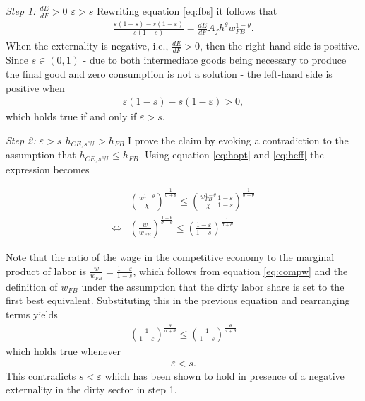 \textit{Step 1: $\frac{dE}{dF}>0$ \ar $\varepsilon>s$}
Rewriting equation \ref{eq:fbs} it follows that
\begin{align}
\frac{\varepsilon(1-s)-s(1-\varepsilon)}{s(1-s)}=\frac{dE}{dF}A_fh^\theta w_{FB}^{1-\theta}.
\end{align}
When the externality is negative, i.e., $\frac{dE}{dF}>0$, then the right-hand side is positive.
Since $s\in(0,1)$ - due to both intermediate goods being necessary to produce the final good and zero consumption is not a solution - the left-hand side is positive when
\begin{align}
\varepsilon(1-s)-s(1-\varepsilon)>0,
\end{align}
which holds true if and only if $\varepsilon>s$.


\textit{Step 2: $\varepsilon>s$ \ar $h_{CE, s^{eff}}>h_{FB}$}
I prove the claim by evoking a contradiction to the assumption that $h_{CE, s^{eff}}\leq h_{FB}$. Using equation \ref{eq:hopt} and \ref{eq:heff} the expression becomes

\begin{align}
&\left(\frac{w^{1-\theta}}{\chi}\right)^{\frac{1}{\sigma+\theta}}\leq \left(\frac{w_{FB}^{1-\theta}}{\chi}\frac{1-\varepsilon}{1-s}\right)^\frac{1}{\sigma+\theta}
\\
\Leftrightarrow&\left(\frac{w}{w_{FB}}\right)^{\frac{1-\theta}{\sigma+\theta}}\leq \left(\frac{1-\varepsilon}{1-s}\right)^\frac{1}{\sigma+\theta}
\end{align}

Note that the ratio of the wage in the competitive economy to the marginal product of labor is $\frac{w}{w_{FB}}=\frac{1-\varepsilon}{1-s}$, which follows from equation \ref{eq:compw} and the definition of $w_{FB}$ under the assumption that the dirty labor share is set to the first best equivalent. Substituting this in the previous equation and rearranging terms yields
\begin{align}
\left(\frac{1}{1-\varepsilon}\right)^\frac{\theta}{\sigma+\theta}\leq \left(\frac{1}{1-s}\right)^\frac{\theta}{\sigma+\theta}
\end{align}
which holds true whenever
\begin{align}
\varepsilon<s.
\end{align}
This contradicts $s<\varepsilon$ which has been shown to hold in presence of a negative externality in the dirty sector in step 1. 
